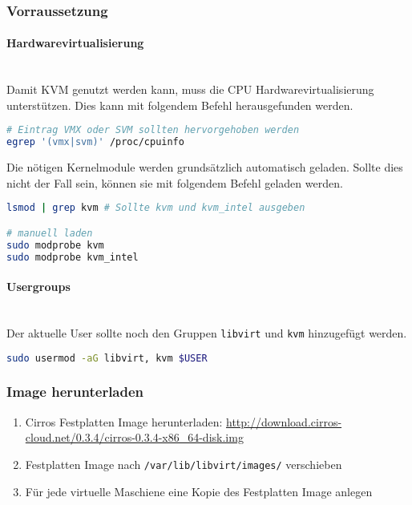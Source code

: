 \subsubsection{Vorraussetzung}
\paragraph{Hardwarevirtualisierung} \hfill \\
Damit KVM genutzt werden kann, muss die CPU Hardwarevirtualisierung unterstützen. Dies kann mit folgendem Befehl herausgefunden werden.
\begin{lstlisting}[language=bash]
# Eintrag VMX oder SVM sollten hervorgehoben werden
egrep '(vmx|svm)' /proc/cpuinfo
\end{lstlisting}

Die nötigen Kernelmodule werden grundsätzlich automatisch geladen. Sollte dies nicht der Fall sein, können sie mit folgendem Befehl geladen werden.
\begin{lstlisting}[language=bash]
lsmod | grep kvm # Sollte kvm und kvm_intel ausgeben 

# manuell laden
sudo modprobe kvm
sudo modprobe kvm_intel
\end{lstlisting}

\paragraph{Usergroups} \hfill \\
Der aktuelle User sollte noch den Gruppen \lstinline|libvirt| und \lstinline|kvm| hinzugefügt werden.
\begin{lstlisting}[language=bash]
sudo usermod -aG libvirt, kvm $USER
\end{lstlisting}





\subsubsection{Image herunterladen}
\begin{enumerate}
	\item Cirros Festplatten Image herunterladen: \url{http://download.cirros-cloud.net/0.3.4/cirros-0.3.4-x86_64-disk.img}
	\item Festplatten Image nach \lstinline|/var/lib/libvirt/images/| verschieben
	\item Für jede virtuelle Maschiene eine Kopie des Festplatten Image anlegen
\end{enumerate}

